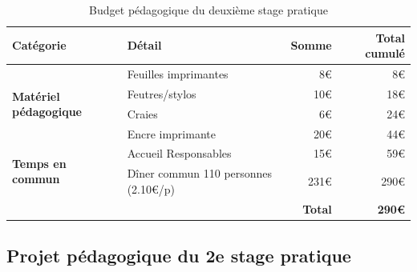 \documentclass[titlepage,11pt,a4paper]{article}
\begin{document}
\begin{table}[!ht]
   \caption{\label{budgped} Budget pédagogique du deuxième stage pratique}
   \vspace{.5em}
   \begin{adjustbox}{center}
   \begin{tabular}{llrr}
      \toprule
      \textbf{Catégorie} & \textbf{Détail} & \textbf{Somme} & \textbf{Total cumulé} \\
      \toprule
      \multirow{4}{10em}{\textbf{Matériel pédagogique}} & Feuilles imprimantes & 8€ & 8€ \\
      & Feutres/stylos & 10€ & 18€ \\
      & Craies & 6€ & 24€ \\
      & Encre imprimante & 20€ & 44€ \\
      \midrule
      \multirow{2}{10em}{\textbf{Temps en commun}} & Accueil Responsables & 15€ & 59€ \\
      & Dîner commun 110 personnes (2.10€/p) & 231€ & 290€ \\
      \bottomrule
      &  & \textbf{Total} & \textbf{290€} \\
      \bottomrule
   \end{tabular}
\end{adjustbox}
\end{table}

\clearpage
\subsection{Projet pédagogique du 2e stage pratique}
\end{document}
